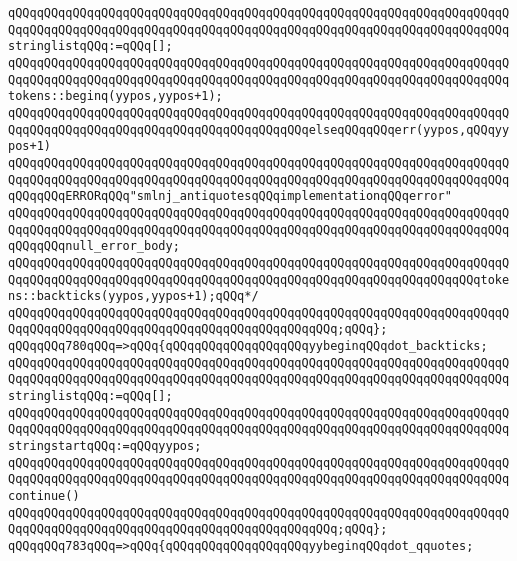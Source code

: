 \verb|qQQqqQQqqQQqqQQqqQQqqQQqqQQqqQQqqQQqqQQqqQQqqQQqqQQqqQQqqQQqqQQqqQQqqQQqqQQqqQQqqQQqqQQqqQQqqQQqqQQqqQQqqQQqqQQqqQQqqQQqqQQqqQQqqQQqqQQqqQQqstringlistqQQq:=qQQq[];|\newline
\verb|qQQqqQQqqQQqqQQqqQQqqQQqqQQqqQQqqQQqqQQqqQQqqQQqqQQqqQQqqQQqqQQqqQQqqQQqqQQqqQQqqQQqqQQqqQQqqQQqqQQqqQQqqQQqqQQqqQQqqQQqqQQqqQQqqQQqqQQqqQQqtokens::beginq(yypos,yypos+1);|\newline
\verb|qQQqqQQqqQQqqQQqqQQqqQQqqQQqqQQqqQQqqQQqqQQqqQQqqQQqqQQqqQQqqQQqqQQqqQQqqQQqqQQqqQQqqQQqqQQqqQQqqQQqqQQqqQQqqQQqelseqQQqqQQqerr(yypos,qQQqyypos+1)|\newline
\verb|qQQqqQQqqQQqqQQqqQQqqQQqqQQqqQQqqQQqqQQqqQQqqQQqqQQqqQQqqQQqqQQqqQQqqQQqqQQqqQQqqQQqqQQqqQQqqQQqqQQqqQQqqQQqqQQqqQQqqQQqqQQqqQQqqQQqqQQqqQQqqQQqqQQqERRORqQQq"smlnj_antiquotesqQQqimplementationqQQqerror"|\newline
\verb|qQQqqQQqqQQqqQQqqQQqqQQqqQQqqQQqqQQqqQQqqQQqqQQqqQQqqQQqqQQqqQQqqQQqqQQqqQQqqQQqqQQqqQQqqQQqqQQqqQQqqQQqqQQqqQQqqQQqqQQqqQQqqQQqqQQqqQQqqQQqqQQqqQQqnull_error_body;|\newline
\verb|qQQqqQQqqQQqqQQqqQQqqQQqqQQqqQQqqQQqqQQqqQQqqQQqqQQqqQQqqQQqqQQqqQQqqQQqqQQqqQQqqQQqqQQqqQQqqQQqqQQqqQQqqQQqqQQqqQQqqQQqqQQqqQQqqQQqqQQqtokens::backticks(yypos,yypos+1);qQQq*/|\newline
\verb|qQQqqQQqqQQqqQQqqQQqqQQqqQQqqQQqqQQqqQQqqQQqqQQqqQQqqQQqqQQqqQQqqQQqqQQqqQQqqQQqqQQqqQQqqQQqqQQqqQQqqQQqqQQqqQQqqQQq;qQQq};|\newline
\verb|qQQqqQQq780qQQq=>qQQq{qQQqqQQqqQQqqQQqqQQqyybeginqQQqdot_backticks;|\newline
\verb|qQQqqQQqqQQqqQQqqQQqqQQqqQQqqQQqqQQqqQQqqQQqqQQqqQQqqQQqqQQqqQQqqQQqqQQqqQQqqQQqqQQqqQQqqQQqqQQqqQQqqQQqqQQqqQQqqQQqqQQqqQQqqQQqqQQqqQQqqQQqstringlistqQQq:=qQQq[];|\newline
\verb|qQQqqQQqqQQqqQQqqQQqqQQqqQQqqQQqqQQqqQQqqQQqqQQqqQQqqQQqqQQqqQQqqQQqqQQqqQQqqQQqqQQqqQQqqQQqqQQqqQQqqQQqqQQqqQQqqQQqqQQqqQQqqQQqqQQqqQQqqQQqstringstartqQQq:=qQQqyypos;|\newline
\verb|qQQqqQQqqQQqqQQqqQQqqQQqqQQqqQQqqQQqqQQqqQQqqQQqqQQqqQQqqQQqqQQqqQQqqQQqqQQqqQQqqQQqqQQqqQQqqQQqqQQqqQQqqQQqqQQqqQQqqQQqqQQqqQQqqQQqqQQqqQQqcontinue()|\newline
\verb|qQQqqQQqqQQqqQQqqQQqqQQqqQQqqQQqqQQqqQQqqQQqqQQqqQQqqQQqqQQqqQQqqQQqqQQqqQQqqQQqqQQqqQQqqQQqqQQqqQQqqQQqqQQqqQQqqQQq;qQQq};|\newline
\verb|qQQqqQQq783qQQq=>qQQq{qQQqqQQqqQQqqQQqqQQqyybeginqQQqdot_qquotes;|\newline
